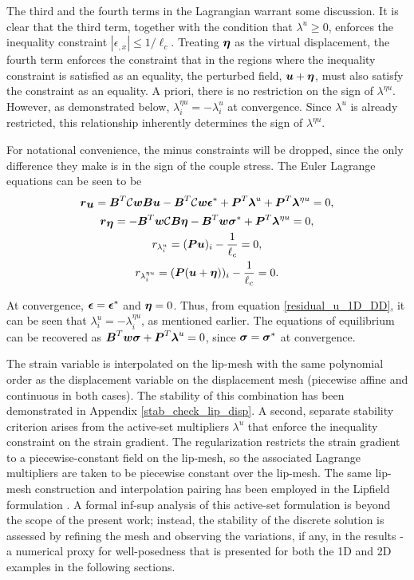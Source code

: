\documentclass[10pt,review]{cas-sc}
\begin{document}
The third and the fourth terms in the Lagrangian warrant some discussion. It is clear that the third term, together with the condition that $\lambda^u \geq 0$, enforces the inequality constraint $|\epsilon_{,x}| \leq 1/\ell_c$. Treating $\mbox{\boldmath $\eta$}$ as the virtual displacement, the fourth term enforces the constraint that in the regions where the inequality constraint is satisfied as an equality, the perturbed field, $\mbox{\boldmath $u$}+\mbox{\boldmath $\eta$}$, must also satisfy the constraint as an equality. A priori, there is no restriction on the sign of $\lambda^{\eta u}$. However, as demonstrated below, $\lambda^{\eta u}_i = -\lambda^{ u}_i$ at convergence. Since $\lambda^u$ is already restricted, this relationship inherently determines the sign of $\lambda^{\eta u}$. 

For notational convenience, the minus constraints will be dropped, since the only difference they make is in the sign of the couple stress. The Euler Lagrange equations can be seen to be
\begin{gather}
	\mbox{\boldmath $r$}_{\mbox{\boldmath $u$}} = \mbox{\boldmath $B$}^T \mathcal{C}\mbox{\boldmath $w$} \mbox{\boldmath $B$} \mbox{\boldmath $u$} - \mbox{\boldmath $B$}^T \mathcal{C}\mbox{\boldmath $w$} \mbox{\boldmath $\epsilon$} ^* + \mbox{\boldmath $P$}^T \mbox{\boldmath $\lambda$}^u +\mbox{\boldmath $P$}^T \mbox{\boldmath $\lambda$}^{\eta u}  =0, \label{residual_u_1D_DD} \\
	\mbox{\boldmath $r$}_{\mbox{\boldmath $\eta$}} = -\mbox{\boldmath $B$}^T\mbox{\boldmath $w$} \mathcal{C} \mbox{\boldmath $B$} \mbox{\boldmath $\eta$} - \mbox{\boldmath $B$}^T\mbox{\boldmath $w$} \mbox{\boldmath $\sigma$} ^* +\mbox{\boldmath $P$}^T \mbox{\boldmath $\lambda$}^{\eta u} =0, \\
	r_{\lambda^u_i} =  (\mbox{\boldmath $P$} \mbox{\boldmath $u$})_i - \frac{1}{\ell_c}  =0, \\
	r_{\lambda^{\eta u}_i} =  (\mbox{\boldmath $P$} (\mbox{\boldmath $u$} + \mbox{\boldmath $\eta$}))_i - \frac{1}{\ell_c}  =0. 
\end{gather}

At convergence, $\mbox{\boldmath $\epsilon$}=\mbox{\boldmath $\epsilon$}^*$ and $\mbox{\boldmath $\eta$}=0$. Thus, from equation \ref{residual_u_1D_DD}, it can be seen that $\lambda^u_i = -\lambda^{\eta u}_i$, as mentioned earlier. The equations of equilibrium can be recovered as $\mbox{\boldmath $B$}^T \mbox{\boldmath $w$} \mbox{\boldmath $\sigma$} +\mbox{\boldmath $P$}^T \mbox{\boldmath $\lambda$}^{u} =0$, since $\mbox{\boldmath $\sigma$} = \mbox{\boldmath $\sigma$}^*$ at convergence.


The strain variable is interpolated on the lip-mesh with the same polynomial order as the displacement variable on the displacement mesh (piecewise affine and continuous in both cases). The stability of this combination has been demonstrated in Appendix \ref{stab_check_lip_disp}. A second, separate stability criterion arises from the active-set multipliers $\lambda^u$ that enforce the inequality constraint on the strain gradient. The regularization restricts the strain gradient to a piecewise-constant field on the lip-mesh, so the associated Lagrange multipliers are taken to be piecewise constant over the lip-mesh. The same lip-mesh construction and interpolation pairing has been employed in the Lipfield formulation \cite{Chevaugeon2021}. A formal inf-sup analysis of this active-set formulation is beyond the scope of the present work; instead, the stability of the discrete solution is assessed by refining the mesh and observing the variations, if any, in the results - a numerical proxy for well-posedness that is presented for both the 1D and 2D examples in the following sections.
\end{document}
